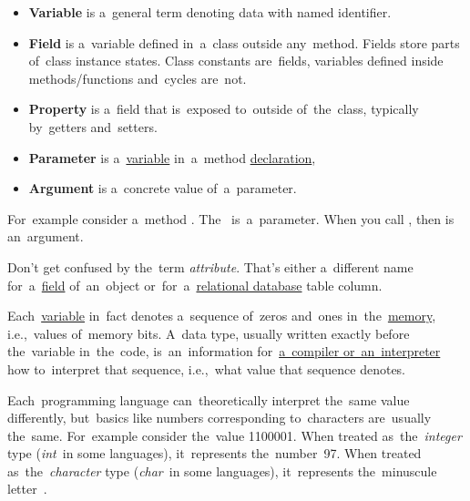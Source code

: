 \label{variablefieldproperty}
\begin{itemize}
    \item \textbf{Variable} is a~general term denoting data with named identifier.
    \item \textbf{Field} is a~variable defined in~a~class outside any~method. Fields store parts of~class instance states. Class constants are~fields, variables defined inside \mbox{methods/functions} and~cycles are~not.
    \item \textbf{Property} is a~field that is~exposed to~outside of~the~class, typically by~getters and~setters.
\end{itemize}

\label{parameterargument}
\begin{itemize}
    \item \textbf{Parameter} is a~\hyperref[variablefieldproperty]{variable} in~a~method \hyperref[declarationdefinition]{declaration},
    \item \textbf{Argument} is a~concrete value of~a~parameter.
\end{itemize}
For~example consider a~method . The~ is~a~parameter. When you call , then  is an~argument.

\warning Don't get confused by the~term \textit{attribute}. That's either a~different name for~a~\hyperref[variablefieldproperty]{field} of~an~object or~for~a~\hyperref[relationaldatabase]{relational database} table column.

\label{datatypes}
Each~\hyperref[variablefieldproperty]{variable} in~fact denotes a~sequence of~zeros and~ones in~the~\hyperref[systemmemory]{memory}, i.e.,~values of~memory bits. A~data type, usually written exactly before the~variable in~the~code, is~an~information for~\hyperref[compiledinterpretedlanguages]{a~compiler or~an~interpreter} how to~interpret that sequence, i.e.,~what value that sequence denotes.

Each~programming language can~theoretically interpret the~same value differently, but~basics like numbers corresponding to~characters are~usually the~same. For~example consider the~value 1100001. When treated as~the~\textit{integer} type (\textit{int}~in some languages), it~represents the~number~97. When treated as~the~\textit{character} type (\textit{char}~in some languages), it~represents the~minuscule letter~.

